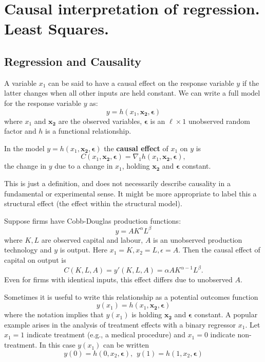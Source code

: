 \documentclass[DIV=14,titlepage=false]{scrreprt}
\begin{document}
\vspace{-10pt}
\setcounter{chapter}{1}

\chapter{Causal interpretation of regression. Least Squares.}
\vspace{-10pt}
\section{Regression and Causality}
A variable $x_1$ can be said to have a causal effect on the response variable $y$ if the latter changes when all other inputs are held constant. We can write a full model for the response variable $y$ as: \[ y = h(x_1, \mathbf{x_2},\boldsymbol{\epsilon}) \] where $x_1$ and $\mathbf{x_2}$ are the observed variables, $\boldsymbol{\epsilon}$ is an $\ell \times 1$ unobserved random factor and $h$ is a functional relationship. 

\begin{definition}\label{def:causaleffect}
In the model $y = h(x_1, \mathbf{x_2},\boldsymbol{\epsilon})$ the \textbf{causal effect} of $x_1$ on $y$ is  \[C(x_1, \mathbf{x_2},\boldsymbol{\epsilon})=\nabla_{1}h(x_1, \mathbf{x_2},\boldsymbol{\epsilon}), \] the change in $y$ due to a change in $x_1$, holding $\mathbf{x_2}$ and $\boldsymbol{\epsilon}$ constant.
\end{definition}

\begin{note}
This is just a definition, and does not necessarily describe causality in a fundamental or experimental sense. It might be more appropriate to label this a structural effect (the effect within the structural model).
\end{note}

\begin{example}
    Suppose firms have Cobb-Douglas production functions: \[y = AK^{\alpha}L^{\beta}\] where $ K,L$ are observed capital and labour, $A$ is an unobserved production technology and $y$ is output. Here $x_1=K, x_2=L, \epsilon=A$. Then the causal effect of capital on output is 
    \[C(K,L,A)= y'(K,L,A) = \alpha AK^{\alpha -1}L^{\beta}.\] Even for firms with identical inputs, this effect differs due to unobserved $A$.
\end{example}

Sometimes it is useful to write this relationship as a potential outcomes function \[y(x_1) = h(x_1, \mathbf{x_2},\boldsymbol{\epsilon}) \] where the notation implies that $y(x_1)$ is holding $\mathbf{x_2}$ and $\boldsymbol{\epsilon}$ constant. A popular example arises in the analysis of treatment effects with a binary regressor \( x_1 \). Let \( x_1 = 1 \) indicate treatment (e.g., a medical procedure) and \( x_1 = 0 \) indicate non-treatment. In this case \( y(x_1) \) can be written
\[
y(0) = h(0, x_2, \boldsymbol{\epsilon}), \hspace{5pt}
y(1) = h(1, x_2, \boldsymbol{\epsilon})
\]
\end{document}
